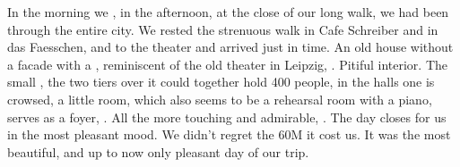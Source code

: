 \documentclass{article}
\begin{document}
In the morning we , in the afternoon, at the close of our long walk, we had been through the entire city. We rested  the strenuous walk in Cafe Schreiber and in das Faesschen, and  to the theater and arrived just in time. An old house without a facade with a , reminiscent of the old theater in Leipzig, . Pitiful interior. The small , the two tiers over it could together hold 400 people, in the halls one is crowsed, a little room, which also seems to be a rehearsal room with a piano, serves as a foyer, . All the more touching and admirable, . The day closes for us in the most pleasant mood. We didn't regret the 60M it cost us. It was the most beautiful, and up to now only pleasant day of our trip.
\end{document}
